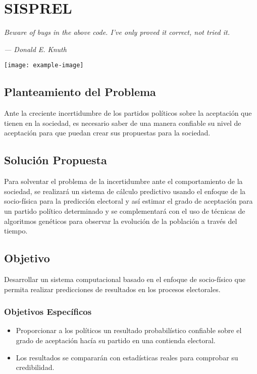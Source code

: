 \chapter{SISPREL}
\epigraph{\textit{Beware of bugs in the above code. I've only proved it correct, not tried it.     
	}}{\textit{—  Donald E. Knuth}}
	\vspace*{5cm}
	\begin{center}
		\centering %
		\texttt{[image: example-image]}
	\end{center}
	\thispagestyle{empty}
	\newpage
	\vspace*{2cm}
\section{Planteamiento del Problema}
Ante la creciente incertidumbre de los partidos políticos sobre la aceptación que tienen en la sociedad, es necesario saber de una manera confiable su nivel de aceptación para que puedan crear sus propuestas para la sociedad.

\section{Solución Propuesta}
Para solventar el problema de la incertidumbre ante el comportamiento de la sociedad, se realizará un sistema de cálculo predictivo usando el enfoque de la socio-física para la predicción electoral y así estimar el grado de aceptación para un partido político determinado y se complementará con el uso de técnicas de algoritmos genéticos para observar la evolución de la población a través del tiempo.

\section{Objetivo}
Desarrollar un sistema computacional basado en el enfoque de socio-físico que permita realizar predicciones de resultados en los procesos electorales. 

\subsection{Objetivos Específicos}
\begin{itemize}
    \item Proporcionar a los políticos un resultado probabilístico confiable sobre el grado de aceptación hacía su partido en una contienda electoral.
    \item Los resultados se compararán con estadísticas reales para comprobar su credibilidad.
\end{itemize}

